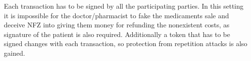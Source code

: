 \subsubsection{}
Each transaction has to be signed by all the participating parties. In this setting it is impossible for the doctor/pharmacist to fake the medicaments sale and deceive NFZ into giving them money for refunding the nonexistent costs, as signature of the patient is also required. Additionally a token that has to be signed changes with each transaction, so protection from repetition attacks is also gained.
